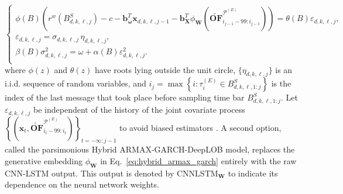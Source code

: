\documentclass{rQUF2e}
\theoremstyle{plain}
\theoremstyle{definition}
\theoremstyle{remark}
\begin{document}
\begin{equation}
    \begin{cases}
        \phi(B) \left( r^w \left( B^S_{d, k, \ell, j} \right) - c - \mathbf{b}_{\boldsymbol{\omega}}^T \mathbf{x}_{d, k, \ell, j - 1} - \mathbf{b}^T_{\mathbf{X}}\phi_{\mathbf{W}} \left( \widetilde{\mathbf{OF}}^{\mathcal{P}^{(E)}}_{i_{j - 1} - 99:i_{j - 1}} \right) \right) = \theta(B) \varepsilon_{d, k, \ell, j}, \\[6pt]
        \varepsilon_{d, k, \ell, j} = \sigma_{d, k, \ell, j} \,\eta_{d, k, \ell, j},                                                                                                                                                                                                                                      \\[6pt]
        \beta(B) \sigma_{d, k, \ell, j}^2 = \omega + \alpha(B) \varepsilon^2_{d, k, \ell, j}.                                                                                                                                                                                                                             \\
    \end{cases}
    \label{eq:hybrid_armax_garch}
\end{equation}
where \(\phi(z)\) and \(\theta(z)\) have roots lying outside the unit circle, \(\{\eta_{d, k, \ell, j}\}\) is an i.i.d. sequence of random variables, and $i_j = \max\left\{i : \tau^{(E)}_{i} \in B^S_{d, k, \ell, 1:j} \right\}$ is the index of the last message that took place before sampling time bar $B^S_{d, k, \ell, 1:j}$. Let \(\varepsilon_{d, k, \ell, j}\) be independent of the history of the joint covariate process \( \left\{ \left( \mathbf{x}_t, \widetilde{\mathbf{OF}}^{\mathcal{P}^{(E)}}_{i_{t} - 99:i_{t}} \right) \right\}_{t = -\infty : j - 1}\) to avoid biased estimators \citep[Ch.~9]{hamilton_time_1994}. A second option, called the parsimonious Hybrid ARMAX-GARCH-DeepLOB model, replaces the generative embedding $\phi_{\mathbf{W}}$ in Eq.~\eqref{eq:hybrid_armax_garch} entirely with the raw CNN-LSTM output. This output is denoted by $\mathrm{CNNLSTM}_{\mathbf{W}}$ to indicate its dependence on the neural network weights.

\end{document}
